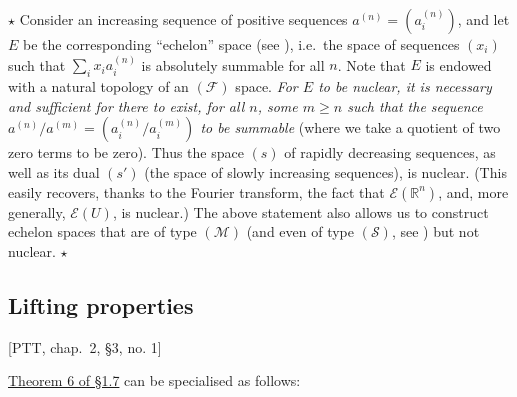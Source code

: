 \documentclass[british]{article}
\begin{document}
\(\star\) Consider an increasing sequence of positive sequences
\(a^{(n)}=(a_i^{(n)})\), and let \(E\) be the corresponding ``echelon''
space (see \autocite{7}), i.e.~the space of sequences \((x_i)\) such
that \(\sum_i x_ia_i^{(n)}\) is absolutely summable for all \(n\). Note
that \(E\) is endowed with a natural topology of an \((\mathscr{F})\)
space. \emph{For \(E\) to be nuclear, it is necessary and sufficient for
there to exist, for all \(n\), some \(m\geqslant n\) such that the
sequence \(a^{(n)}/a^{(m)}=(a_i^{(n)}/a_i^{(m)})\) to be summable}
(where we take a quotient of two zero terms to be zero). Thus the space
\((s)\) of rapidly decreasing sequences, as well as its dual \((s')\)
(the space of slowly increasing sequences), is nuclear. (This easily
recovers, thanks to the Fourier transform, the fact that
\(\mathscr{E}(\mathbb{R}^n)\), and, more generally, \(\mathscr{E}(U)\),
is nuclear.) The above statement also allows us to construct echelon
spaces that are of type \((\mathscr{M})\) (and even of type
\((\mathscr{S})\), see \autocite[Section 3]{6}) but not nuclear.
\(\star\)

\subsection{Lifting properties}\label{section-2.4}

{[}PTT, chap.~2, §3, no. 1{]}

\hyperref[section-1-theorem-6]{Theorem 6 of §1.7} can be specialised as
follows:
\end{document}
